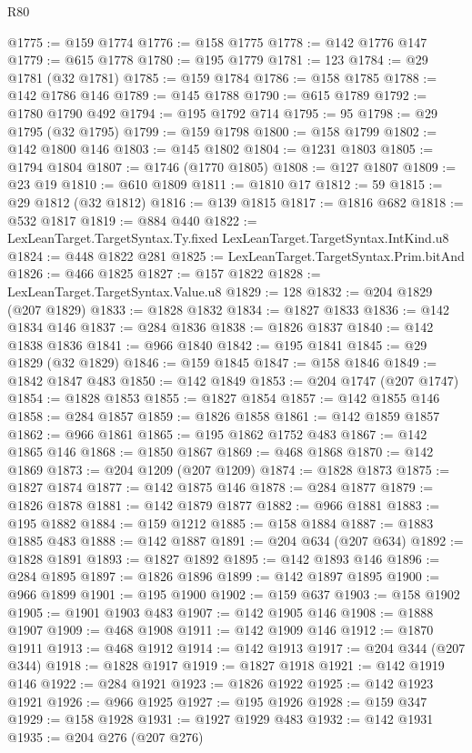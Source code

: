 \begin{lexlean}{R80}
\begin{coremodule}
@1775 := @159 @1774
@1776 := @158 @1775
@1778 := @142 @1776 @147
@1779 := @615 @1778
@1780 := @195 @1779
@1781 := 123
@1784 := @29 @1781 (@32 @1781)
@1785 := @159 @1784
@1786 := @158 @1785
@1788 := @142 @1786 @146
@1789 := @145 @1788
@1790 := @615 @1789
@1792 := @1780 @1790 @492
@1794 := @195 @1792 @714
@1795 := 95
@1798 := @29 @1795 (@32 @1795)
@1799 := @159 @1798
@1800 := @158 @1799
@1802 := @142 @1800 @146
@1803 := @145 @1802
@1804 := @1231 @1803
@1805 := @1794 @1804
@1807 := @1746 (@1770 @1805)
@1808 := @127 @1807
@1809 := @23 @19
@1810 := @610 @1809
@1811 := @1810 @17
@1812 := 59
@1815 := @29 @1812 (@32 @1812)
@1816 := @139 @1815
@1817 := @1816 @682
@1818 := @532 @1817
@1819 := @884 @440
@1822 := LexLeanTarget.TargetSyntax.Ty.fixed LexLeanTarget.TargetSyntax.IntKind.u8
@1824 := @448 @1822 @281
@1825 := LexLeanTarget.TargetSyntax.Prim.bitAnd
@1826 := @466 @1825
@1827 := @157 @1822
@1828 := LexLeanTarget.TargetSyntax.Value.u8
@1829 := 128
@1832 := @204 @1829 (@207 @1829)
@1833 := @1828 @1832
@1834 := @1827 @1833
@1836 := @142 @1834 @146
@1837 := @284 @1836
@1838 := @1826 @1837
@1840 := @142 @1838 @1836
@1841 := @966 @1840
@1842 := @195 @1841
@1845 := @29 @1829 (@32 @1829)
@1846 := @159 @1845
@1847 := @158 @1846
@1849 := @1842 @1847 @483
@1850 := @142 @1849
@1853 := @204 @1747 (@207 @1747)
@1854 := @1828 @1853
@1855 := @1827 @1854
@1857 := @142 @1855 @146
@1858 := @284 @1857
@1859 := @1826 @1858
@1861 := @142 @1859 @1857
@1862 := @966 @1861
@1865 := @195 @1862 @1752 @483
@1867 := @142 @1865 @146
@1868 := @1850 @1867
@1869 := @468 @1868
@1870 := @142 @1869
@1873 := @204 @1209 (@207 @1209)
@1874 := @1828 @1873
@1875 := @1827 @1874
@1877 := @142 @1875 @146
@1878 := @284 @1877
@1879 := @1826 @1878
@1881 := @142 @1879 @1877
@1882 := @966 @1881
@1883 := @195 @1882
@1884 := @159 @1212
@1885 := @158 @1884
@1887 := @1883 @1885 @483
@1888 := @142 @1887
@1891 := @204 @634 (@207 @634)
@1892 := @1828 @1891
@1893 := @1827 @1892
@1895 := @142 @1893 @146
@1896 := @284 @1895
@1897 := @1826 @1896
@1899 := @142 @1897 @1895
@1900 := @966 @1899
@1901 := @195 @1900
@1902 := @159 @637
@1903 := @158 @1902
@1905 := @1901 @1903 @483
@1907 := @142 @1905 @146
@1908 := @1888 @1907
@1909 := @468 @1908
@1911 := @142 @1909 @146
@1912 := @1870 @1911
@1913 := @468 @1912
@1914 := @142 @1913
@1917 := @204 @344 (@207 @344)
@1918 := @1828 @1917
@1919 := @1827 @1918
@1921 := @142 @1919 @146
@1922 := @284 @1921
@1923 := @1826 @1922
@1925 := @142 @1923 @1921
@1926 := @966 @1925
@1927 := @195 @1926
@1928 := @159 @347
@1929 := @158 @1928
@1931 := @1927 @1929 @483
@1932 := @142 @1931
@1935 := @204 @276 (@207 @276)

\end{coremodule}
\end{lexlean}
